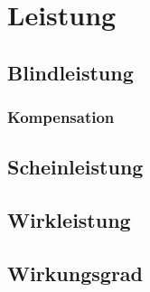 \chapter{Leistung}
\section{Blindleistung}
\subsection{Kompensation}
\section{Scheinleistung}
\section{Wirkleistung}
\section{Wirkungsgrad}